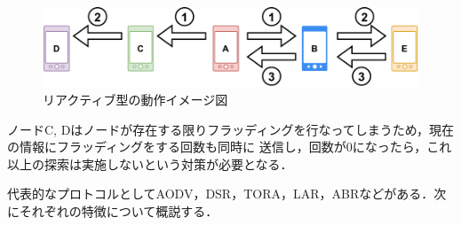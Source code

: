 \documentclass[a4paper, 11pt]{ltjsarticle}
\begin{document}
\begin{figure}[h]
  \centering
  \includegraphics[width=130mm]{reactive_model.pdf}
  \caption{リアクティブ型の動作イメージ図}
  \label{reactive}
\end{figure}

ノードC, Dはノードが存在する限りフラッディングを行なってしまうため，現在の情報にフラッディングをする回数も同時に
送信し，回数が0になったら，これ以上の探索は実施しないという対策が必要となる．

代表的なプロトコルとしてAODV，DSR，TORA，LAR，ABRなどがある．次にそれぞれの特徴について概説する．
\end{document}
